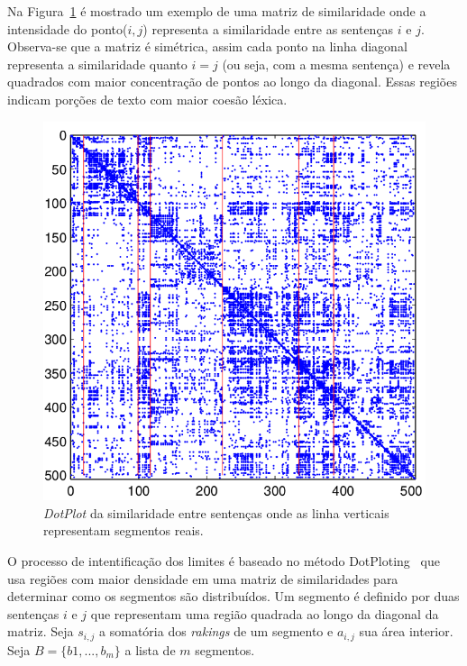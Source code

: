 \documentclass[10pt,a4paper]{article}
\begin{document}
Na Figura~\ref{fig:matrix-similarity} é mostrado um exemplo de uma matriz de similaridade onde a intensidade do ponto($i,j$) representa a similaridade entre as sentenças $i$ e $j$. Observa-se que a matriz é simétrica, assim cada ponto na linha diagonal representa a similaridade quanto $i = j$ (ou seja, com a mesma sentença) e revela quadrados com maior concentração de pontos ao longo da diagonal. Essas regiões indicam porções de texto com maior coesão léxica.


  \begin{figure}[!h]
	  \centering
	  \includegraphics[width=1\textwidth]{c99.png}
	  \caption{\textit{DotPlot} da similaridade entre sentenças onde as linha verticais representam segmentos reais.}
	  \label{fig:matrix-similarity}
  \end{figure}







O processo de intentificação dos limites é baseado no método DotPloting~\cite{Reynar} que usa regiões com maior densidade em uma matriz de similaridades para determinar como os segmentos são distribuídos. Um segmento é definido por duas sentenças $i$ e $j$ que representam uma região quadrada ao longo da diagonal da matriz. 
%
%
%
Seja $s_{i,j}$ a somatória dos \textit{rakings} de um segmento e $a_{i,j}$ sua área interior. Seja $B = \{b1,...,b_m\}$ a lista de $m$ segmentos.
\end{document}
